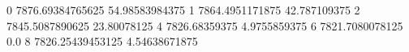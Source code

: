 0 7876.69384765625 54.98583984375
1 7864.4951171875 42.787109375
2 7845.5087890625 23.80078125
4 7826.68359375 4.9755859375
6 7821.7080078125 0.0
8 7826.25439453125 4.54638671875
